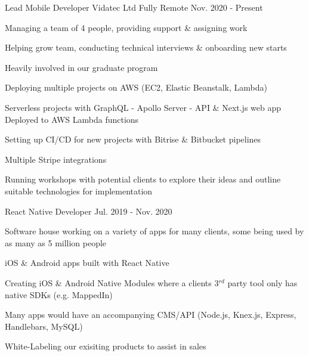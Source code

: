 

\begin{cventries}

  \cventry
    {Lead Mobile Developer} %
    {Vidatec Ltd} %
    {Fully Remote} %
    {Nov. 2020 - Present} %
    {
      \begin{cvitems} %
        \item {Managing a team of 4 people, providing support \& assigning work}
        \item {Helping grow team, conducting technical interviews \& onboarding new starts}
        \item {Heavily involved in our graduate program}
        \item {Deploying multiple projects on AWS (EC2, Elastic Beanstalk, Lambda)}
        \item {Serverless projects with GraphQL - Apollo Server - API \& Next.js web app Deployed to AWS Lambda functions}
        \item {Setting up CI/CD for new projects with Bitrise \& Bitbucket pipelines}
        \item {Multiple Stripe integrations}
        \item {Running workshops with potential clients to explore their ideas and outline suitable technologies for implementation}
      \end{cvitems}
    }

  \cventry
    {React Native Developer} %
    {} %
    {} %
    {Jul. 2019 - Nov. 2020} %
    {
      \begin{cvitems} %
        \item {Software house working on a variety of apps for many clients, some being used by as many as 5 million people}
        \item {iOS \& Android apps built with React Native}
        \item {Creating iOS \& Android Native Modules where a clients 3$^{rd}$ party tool only has native SDKs (e.g. MappedIn)}
        \item {Many apps would have an accompanying CMS/API (Node.js, Knex.js, Express, Handlebars, MySQL)}
        \item {White-Labeling our exisiting products to assist in sales}
      \end{cvitems}
    }


\end{cventries}
